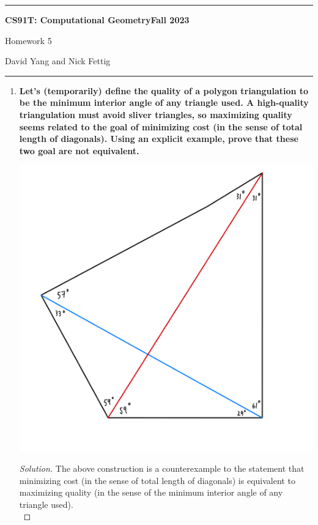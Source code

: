 \documentclass[11pt]{article}
\newenvironment{solution}
  {\renewcommand\qedsymbol{$\blacksquare$}\begin{proof}[Solution]}
  {\end{proof}}
\begin{document}
\hrule
\begin{center}
    \textbf{CS91T: Computational Geometry}\hfill \textbf{Fall 2023}\newline

    {\Large Homework 5}

    David Yang and Nick Fettig
\end{center}

\hrule

\vspace{1em}


\begin{enumerate}
\item\textbf{Let’s (temporarily) define the quality of a polygon triangulation to be the minimum interior angle of any triangle used. A high-quality triangulation must avoid sliver triangles, so maximizing quality seems related to the goal of minimizing cost (in the sense of total length of diagonals). Using an explicit example, prove that these two goal are not equivalent.}

\begin{center}
\includegraphics[scale=0.25]{images/HW5/CS91.HW5.1.jpeg}
\end{center}

\begin{solution}
The above construction is a counterexample to the statement that minimizing cost (in the sense of total length of diagonals) is equivalent to maximizing quality (in the sense of the minimum interior angle of any triangle used). \\


\end{solution}
\end{enumerate}
\end{document}

